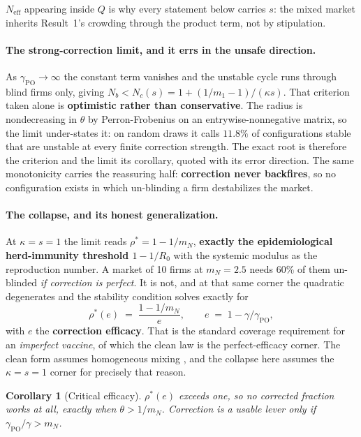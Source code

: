 \documentclass{article}
\theoremstyle{plain}
\newtheorem{corollary}[theorem]{Corollary}
\theoremstyle{definition}
\newcommand{\Neff}{N_{\mathrm{eff}}}
\newcommand{\mN}{m_N}
\begin{document}
$\Neff$ appearing inside $Q$ is why every statement below carries $s$: the mixed market inherits Result~1's crowding through the product term, not by stipulation.

\paragraph{The strong-correction limit, and it errs in the unsafe direction.}
As $\gamma_{\mathrm{PO}}\to\infty$ the constant term vanishes and the unstable cycle runs through blind firms only, giving $N_b < N_c(s) = 1 + (1/m_1 - 1)/(\kappa s)$. That criterion taken alone is \textbf{optimistic rather than conservative}. The radius is nondecreasing in $\theta$ by Perron-Frobenius on an entrywise-nonnegative matrix, so the limit under-states it: on random draws it calls $11.8\%$ of configurations stable that are unstable at every finite correction strength. The exact root is therefore the criterion and the limit its corollary, quoted with its error direction. The same monotonicity carries the reassuring half: \textbf{correction never backfires}, so no configuration exists in which un-blinding a firm destabilizes the market.

\paragraph{The collapse, and its honest generalization.}
At $\kappa = s = 1$ the limit reads $\rho^{*} = 1 - 1/\mN$, \textbf{exactly the epidemiological herd-immunity threshold $1-1/R_0$} with the systemic modulus as the reproduction number. A market of 10 firms at $\mN = 2.5$ needs 60\% of them un-blinded \emph{if correction is perfect}. It is not, and at that same corner the quadratic degenerates and the stability condition solves exactly for
\begin{equation}
\rho^{*}(e) \;=\; \frac{1 - 1/\mN}{e}, \qquad e \;=\; 1 - \gamma/\gamma_{\mathrm{PO}},
\end{equation}
with $e$ the \textbf{correction efficacy}. That is the standard coverage requirement for an \emph{imperfect vaccine}, of which the clean law is the perfect-efficacy corner. The clean form assumes homogeneous mixing \citep{fine2011}, and the collapse here assumes the $\kappa=s=1$ corner for precisely that reason.

\begin{corollary}[Critical efficacy]
\label{cor:efficacy}
$\rho^{*}(e)$ exceeds one, so no corrected fraction works at all, exactly when $\theta > 1/\mN$. Correction is a usable lever only if $\gamma_{\mathrm{PO}}/\gamma > \mN$.
\end{corollary}
\end{document}
